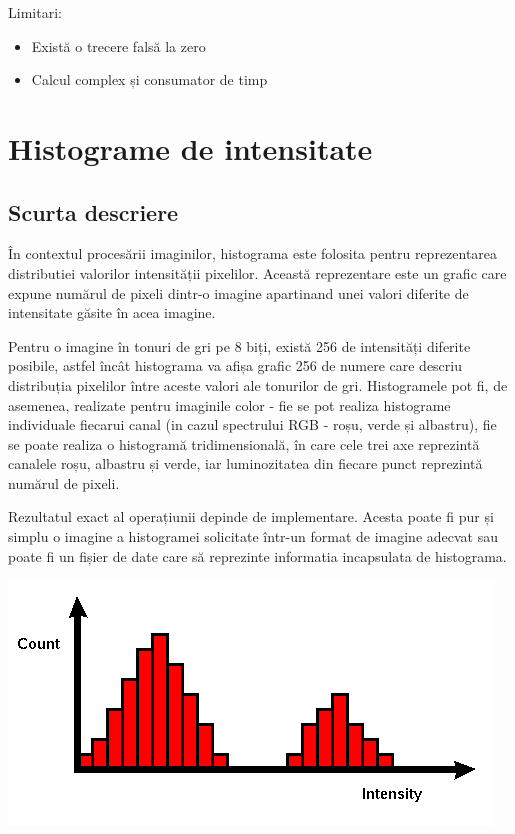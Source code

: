 \documentclass[10pt]{article}
\begin{document}
\> Limitari:
\begin{itemize}

  \item Există o trecere falsă la zero
  \item Calcul complex și consumator de timp
  
\end{itemize}

\newpage

\section{Histograme de intensitate}

\subsection{Scurta descriere}

\> În contextul procesării imaginilor, histograma este folosita pentru reprezentarea distributiei valorilor intensității pixelilor.
Această reprezentare este un grafic care expune numărul de pixeli dintr-o imagine apartinand unei valori diferite de intensitate găsite în acea imagine.

\> Pentru o imagine în tonuri de gri pe 8 biți, există 256 de intensități diferite posibile, astfel încât histograma va afișa grafic 256 de numere
care descriu distribuția pixelilor între aceste valori ale tonurilor de gri. Histogramele pot fi, de asemenea, realizate pentru imaginile color -
fie se pot realiza histograme individuale fiecarui canal (in cazul spectrului RGB - roșu, verde și albastru), fie se poate realiza o histogramă tridimensională, 
în care cele trei axe reprezintă canalele roșu, albastru și verde, iar luminozitatea din fiecare punct reprezintă numărul de pixeli.
 
 \> Rezultatul exact al operațiunii depinde de implementare. Acesta poate fi pur și simplu o imagine a histogramei solicitate într-un format de
imagine adecvat sau poate fi un fișier de date care să reprezinte informatia incapsulata de histograma.


\begin{center}

  \includegraphics[scale=0.7]{histograma-intensitate}
  
\end{center}
\end{document}
